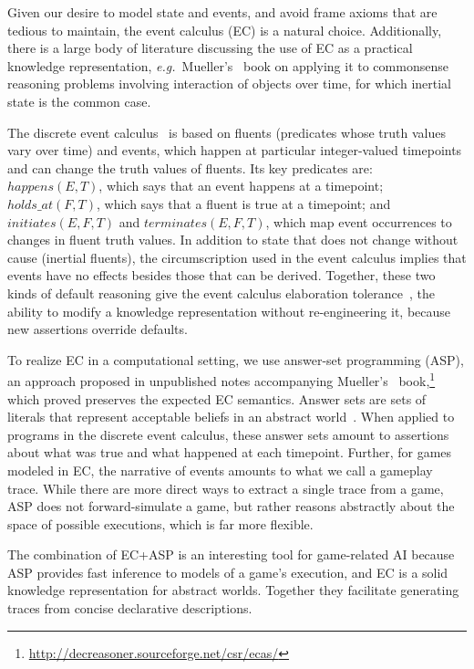 \documentclass[letterpaper]{article}
\newcommand{\logical}[1]{$#1$}
\begin{document}
Given our desire to model state and events, and avoid frame axioms that are
tedious to maintain, the event calculus (EC) is a natural choice.
Additionally, there is a large body of literature discussing the use of EC as a
practical knowledge representation, \emph{e.g.}\
Mueller's~\citeyearpar{Mueller:book} book on applying it to commonsense
reasoning problems involving interaction of objects over time, for which
inertial state is the common case.

The discrete event calculus~\citep{DEC} is based on fluents (predicates
whose truth values vary over time) and events, which happen at particular
integer-valued timepoints and can change the truth values of fluents. Its key
predicates are: \logical{happens(E,T)}, which says that an event happens at a
timepoint; \logical{holds\_at(F,T)}, which says that a fluent is true at a
timepoint; and \logical{initiates(E,F,T)} and \logical{terminates(E,F,T)}, which
map event occurrences to changes in fluent truth values. In addition to state
that does not change without cause (inertial fluents), the circumscription used
in the event calculus implies that events have no effects besides those that
can be derived. Together, these two kinds of default reasoning give the event
calculus elaboration tolerance~\citep{McCarthy:elaboration}, the ability to
modify a knowledge representation without re-engineering it, because new
assertions override defaults.

To realize EC in a computational setting, we use answer-set programming (ASP),
an approach proposed in unpublished notes accompanying
Mueller's~\citeyearpar{Mueller:book}
book,\footnote{\url{http://decreasoner.sourceforge.net/csr/ecas/}} which
\citet{ECASP} proved preserves the expected EC semantics.  Answer sets are sets
of literals that represent acceptable beliefs in an abstract world~\citep{ASP}.
When applied to programs in the discrete event calculus, these answer sets
amount to assertions about what was true and what happened at each timepoint.
Further, for games modeled in EC, the narrative of events amounts to what we
call a gameplay trace. While there are more direct ways to extract a single
trace from a game, ASP does not forward-simulate a game, but rather reasons
abstractly about the space of possible executions, which is far more flexible.

The combination of EC+ASP is an interesting tool for game-related AI because
ASP provides fast inference to models of a game's execution, and EC is a solid
knowledge representation for abstract worlds. Together they facilitate
generating traces from concise declarative descriptions.
\end{document}
